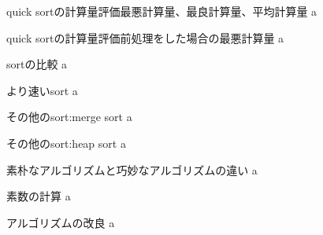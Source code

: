 \documentclass{beamer}
\begin{document}
\begin{frame}[fragile]{quick sortの計算量評価}{最悪計算量、最良計算量、平均計算量}
a
\end{frame}

\begin{frame}[fragile]{quick sortの計算量評価}{前処理をした場合の最悪計算量}
a
\end{frame}

\begin{frame}[fragile]{sortの比較}{}
a
\end{frame}

\begin{frame}[fragile]{より速いsort}{}
a
\end{frame}

\begin{frame}[fragile]{その他のsort:merge sort}{}
a
\end{frame}

\begin{frame}[fragile]{その他のsort:heap sort}{}
a
\end{frame}

\begin{frame}[fragile]{素朴なアルゴリズムと巧妙なアルゴリズムの違い}{}
a
\end{frame}

\begin{frame}[fragile]{素数の計算}{}
a
\end{frame}

\begin{frame}[fragile]{アルゴリズムの改良}{}
a
\end{frame}
\end{document}
